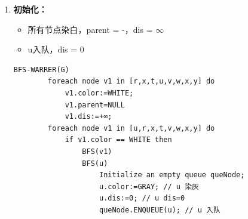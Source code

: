 \documentclass{article}
\begin{document}
\begin{enumerate}
    \item \textbf{初始化：}
    \begin{itemize}
        \item 所有节点染白，parent = -，dis = $\infty$
        \item u入队，dis = 0
    \end{itemize}

    \begin{lstlisting}[style=algorithmPPT]
        BFS-WARRER(G)
        foreach node v1 in [r,x,t,u,v,w,x,y] do
            v1.color:=WHITE; 
            v1.parent=NULL 
            v1.dis:=+∞;
        foreach node v1 in [u,r,x,t,v,w,x,y] do
            if v1.color == WHITE then
                BFS(v1)
                BFS(u)
                    Initialize an empty queue queNode;
                    u.color:=GRAY; // u 染灰
                    u.dis:=0; // u dis=0
                    queNode.ENQUEUE(u); // u 入队
    \end{lstlisting}
\begin{figure}[htbp]
    \begin{minipage}[b]{0.6\textwidth}    %
            \centering
\end{minipage}
\end{figure}
\end{enumerate}
\end{document}
